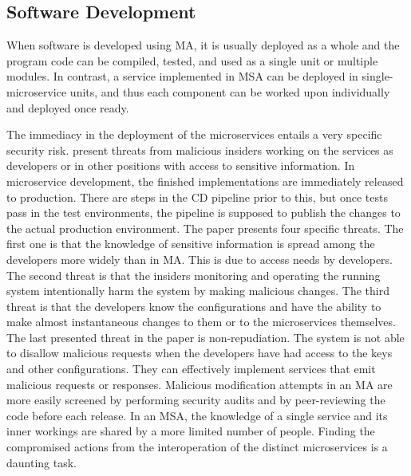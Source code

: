\subsection{Software Development}
\begin{sloppypar}
    When software is developed using MA, it is usually deployed as a whole and
    the program code can be compiled, tested, and used as a single unit or
    multiple modules. In contrast, a service implemented in MSA can be deployed
    in single-microservice units, and thus each component can be worked upon
    individually and deployed once ready. 
\end{sloppypar}
\begin{sloppypar}
    The immediacy in the deployment of the microservices entails a very specific
    security risk. \citet{integinside} present threats from malicious insiders
    working on the services as developers or in other positions with access to
    sensitive information. In microservice development, the finished
    implementations are immediately released to production. There are steps in
    the CD pipeline prior to this, but once tests pass in the test environments,
    the pipeline is supposed to publish the changes to the actual production
    environment. The paper presents four specific threats. The first one is that
    the knowledge of sensitive information is spread among the developers more
    widely than in MA. This is due to access needs by developers. The second
    threat is that the insiders monitoring and operating the running system
    intentionally harm the system by making malicious changes. The third threat
    is that the developers know the configurations and have the ability to make
    almost instantaneous changes to them or to the microservices themselves. The
    last presented threat in the paper is non-repudiation. The system is not
    able to disallow malicious requests when the developers have had access to
    the keys and other configurations. They can effectively implement services
    that emit malicious requests or responses. Malicious modification attempts
    in an MA are more easily screened by performing security audits and by
    peer-reviewing the code before each release. In an MSA, the knowledge of a
    single service and its inner workings are shared by a more limited number of
    people. Finding the compromised actions from the interoperation of the
    distinct microservices is a daunting task.
\end{sloppypar}

